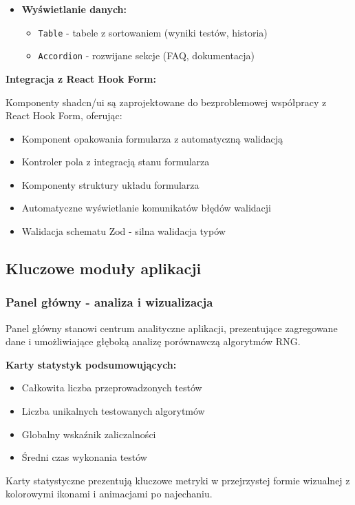 \documentclass[12pt,a4paper]{article}
\begin{document}
\begin{itemize}
    \item \textbf{Wyświetlanie danych:}
    \begin{itemize}
        \item \texttt{Table} - tabele z sortowaniem (wyniki testów, historia)
        \item \texttt{Accordion} - rozwijane sekcje (FAQ, dokumentacja)
    \end{itemize}
\end{itemize}

\textbf{Integracja z React Hook Form:}

Komponenty shadcn/ui są zaprojektowane do bezproblemowej współpracy z React Hook Form, oferując:
\begin{itemize}
    \item Komponent opakowania formularza z automatyczną walidacją
    \item Kontroler pola z integracją stanu formularza
    \item Komponenty struktury układu formularza
    \item Automatyczne wyświetlanie komunikatów błędów walidacji
    \item Walidacja schematu Zod - silna walidacja typów
\end{itemize}

\subsection{Kluczowe moduły aplikacji}

\subsubsection{Panel główny - analiza i wizualizacja}

Panel główny stanowi centrum analityczne aplikacji, prezentujące zagregowane dane i umożliwiające głęboką analizę porównawczą algorytmów RNG.

\textbf{Karty statystyk podsumowujących:}
\begin{itemize}
    \item Całkowita liczba przeprowadzonych testów
    \item Liczba unikalnych testowanych algorytmów
    \item Globalny wskaźnik zaliczalności
    \item Średni czas wykonania testów
\end{itemize}

Karty statystyczne prezentują kluczowe metryki w przejrzystej formie wizualnej z kolorowymi ikonami i animacjami po najechaniu.
\end{document}
